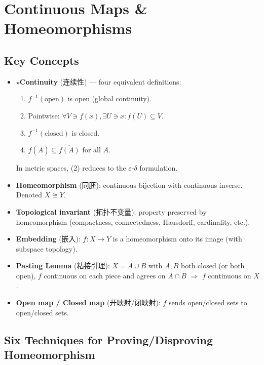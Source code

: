 \documentclass{article}
\newcommand{\starKey}{\textcolor{red!65!black}{\textbf{$\star$}}}
\begin{document}
\section{Continuous Maps \& Homeomorphisms}

\subsection{Key Concepts}

\begin{itemize}
  \item \starKey \textbf{Continuity} (连续性) --- four equivalent definitions:
  \begin{enumerate}
    \item $f^{-1}(\text{open})$ is open (global continuity).
    \item Pointwise: $\forall V\ni f(x),\exists U\ni x: f(U)\subseteq V$.
    \item $f^{-1}(\text{closed})$ is closed.
    \item $f(\overline{A})\subseteq\overline{f(A)}$ for all $A$.
  \end{enumerate}
  In metric spaces, (2) reduces to the $\varepsilon$-$\delta$ formulation.
  \item \textbf{Homeomorphism} (同胚): continuous bijection with continuous inverse.
  Denoted $X\cong Y$.
  \item \textbf{Topological invariant} (拓扑不变量): property preserved by homeomorphism
  (compactness, connectedness, Hausdorff, cardinality, etc.).
  \item \textbf{Embedding} (嵌入): $f:X\to Y$ is a homeomorphism onto its image
  (with subspace topology).
  \item \textbf{Pasting Lemma} (粘接引理): $X=A\cup B$ with $A,B$ both closed (or both open),
  $f$ continuous on each piece and agrees on $A\cap B$ $\Rightarrow$ $f$ continuous on $X$.
  \item \textbf{Open map / Closed map} (开映射/闭映射): $f$ sends open/closed sets
  to open/closed sets.
\end{itemize}

\subsection{Six Techniques for Proving/Disproving Homeomorphism}
\end{document}
